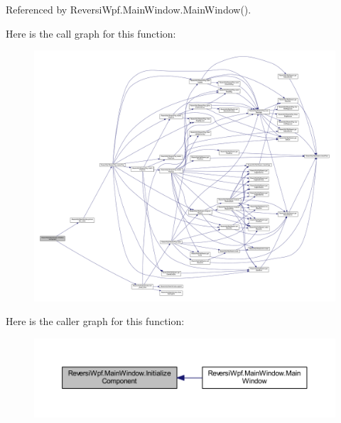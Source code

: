 Referenced by Reversi\+Wpf.\+Main\+Window.\+Main\+Window().

Here is the call graph for this function\+:
\nopagebreak
\begin{figure}[H]
\begin{center}
\leavevmode
\includegraphics[width=350pt]{class_reversi_wpf_1_1_main_window_a4cf9bc92cee02fa8e3b00fa56fb41c82_cgraph}
\end{center}
\end{figure}
Here is the caller graph for this function\+:
\nopagebreak
\begin{figure}[H]
\begin{center}
\leavevmode
\includegraphics[width=350pt]{class_reversi_wpf_1_1_main_window_a4cf9bc92cee02fa8e3b00fa56fb41c82_icgraph}
\end{center}
\end{figure}
\mbox{\label{class_reversi_wpf_1_1_main_window_a4cf9bc92cee02fa8e3b00fa56fb41c82}} 
